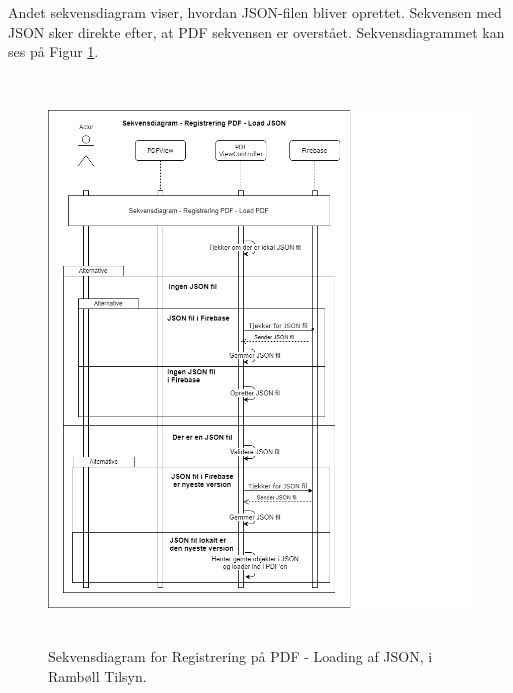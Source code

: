 Andet sekvensdiagram viser, hvordan JSON-filen bliver oprettet. Sekvensen med JSON sker direkte efter, at PDF sekvensen er overstået. Sekvensdiagrammet kan ses på Figur \ref{fig:LoadJSONSekvensDiagram}.
\begin{figure}[H] %
	\centering
	\includegraphics[height=15cm, width=15cm]{Design/Applikation/RegistrePDF/LoadJSONSekvensDiagram}
	\caption{Sekvensdiagram for Registrering på PDF - Loading af JSON, i Rambøll Tilsyn.}
	\label{fig:LoadJSONSekvensDiagram}
\end{figure}

\clearpage

